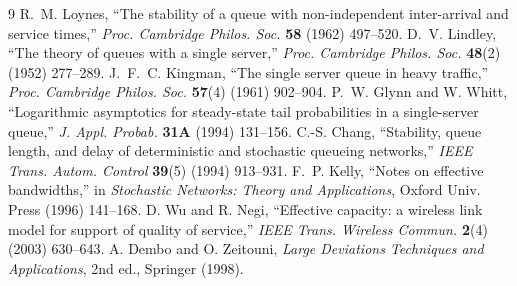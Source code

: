 \documentclass[11pt]{article}
\begin{document}
\begin{thebibliography}{9}
 R.~M. Loynes, ``The stability of a queue with non-independent inter-arrival and service times,'' \emph{Proc. Cambridge Philos. Soc.} \textbf{58} (1962) 497--520.
 D.~V. Lindley, ``The theory of queues with a single server,'' \emph{Proc. Cambridge Philos. Soc.} \textbf{48}(2) (1952) 277--289.
 J.~F.~C. Kingman, ``The single server queue in heavy traffic,'' \emph{Proc. Cambridge Philos. Soc.} \textbf{57}(4) (1961) 902--904.
 P.~W. Glynn and W. Whitt, ``Logarithmic asymptotics for steady-state tail probabilities in a single-server queue,'' \emph{J. Appl. Probab.} \textbf{31A} (1994) 131--156.
 C.-S. Chang, ``Stability, queue length, and delay of deterministic and stochastic queueing networks,'' \emph{IEEE Trans. Autom. Control} \textbf{39}(5) (1994) 913--931.
 F.~P. Kelly, ``Notes on effective bandwidths,'' in \emph{Stochastic Networks: Theory and Applications}, Oxford Univ. Press (1996) 141--168.
 D. Wu and R. Negi, ``Effective capacity: a wireless link model for support of quality of service,'' \emph{IEEE Trans. Wireless Commun.} \textbf{2}(4) (2003) 630--643.
 A. Dembo and O. Zeitouni, \emph{Large Deviations Techniques and Applications}, 2nd ed., Springer (1998).
\end{thebibliography}
\end{document}
